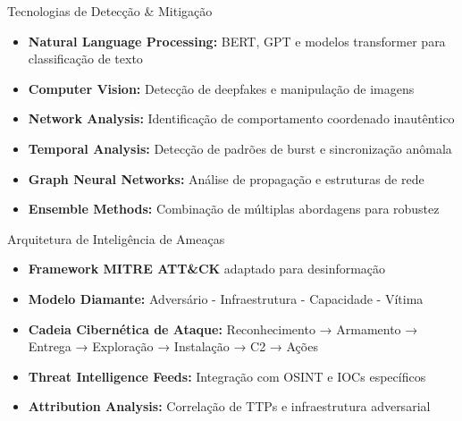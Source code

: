\documentclass[aspectratio=169,xcolor=table]{beamer}
\begin{document}
\begin{frame}{Tecnologias de Detecção \& Mitigação}
    \begin{itemize}
        \item \textbf{Natural Language Processing:} BERT, GPT e modelos transformer para classificação de texto
        \item \textbf{Computer Vision:} Detecção de deepfakes e manipulação de imagens
        \item \textbf{Network Analysis:} Identificação de comportamento coordenado inautêntico
        \item \textbf{Temporal Analysis:} Detecção de padrões de burst e sincronização anômala
        \item \textbf{Graph Neural Networks:} Análise de propagação e estruturas de rede
        \item \textbf{Ensemble Methods:} Combinação de múltiplas abordagens para robustez
    \end{itemize}
\end{frame}

\begin{frame}{Arquitetura de Inteligência de Ameaças}
    \begin{itemize}
        \item \textbf{Framework MITRE ATT\&CK} adaptado para desinformação
        \item \textbf{Modelo Diamante:} Adversário - Infraestrutura - Capacidade - Vítima
        \item \textbf{Cadeia Cibernética de Ataque:} Reconhecimento → Armamento → Entrega → Exploração → Instalação → C2 → Ações
        \item \textbf{Threat Intelligence Feeds:} Integração com OSINT e IOCs específicos
        \item \textbf{Attribution Analysis:} Correlação de TTPs e infraestrutura adversarial
    \end{itemize}
\end{frame}
\end{document}

